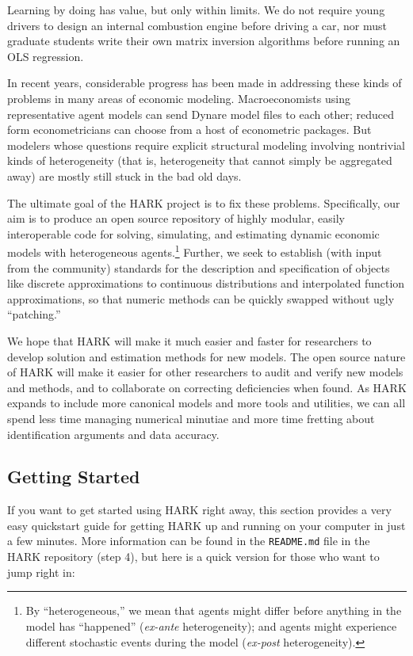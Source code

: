 \documentclass[12pt,titlepage,letterpaper]{econtex}
\begin{document}
{Learning by doing has value, but only within limits.  We do not require young drivers to design an internal combustion engine before driving a car, nor must graduate students write their own matrix inversion algorithms before running an OLS regression.  

In recent years, considerable progress has been made in addressing these kinds of problems in many areas of economic modeling.  Macroeconomists using representative agent models can send Dynare model files to each other; reduced form econometricians can choose from a host of econometric packages.  But modelers whose questions require explicit structural modeling involving nontrivial kinds of heterogeneity (that is, heterogeneity that cannot simply be aggregated away) are mostly still stuck in the bad old days.

The ultimate goal of the HARK project is to fix these problems.  Specifically, our aim is to produce an open source repository of highly modular, easily interoperable code for solving, simulating, and estimating dynamic economic models with heterogeneous agents.\footnote{By ``heterogeneous,'' we mean that agents might differ before anything in the model has ``happened'' (\textit{ex-ante} heterogeneity); and agents might experience different stochastic events during the model (\textit{ex-post} heterogeneity).}  Further, we seek to establish (with input from the community) standards for the description and specification of objects like discrete approximations to continuous distributions and interpolated function approximations, so that numeric methods can be quickly swapped without ugly ``patching.''

We hope that HARK will make it much easier and faster for researchers to develop solution and estimation methods for new models.  The open source nature of HARK will make it easier for other researchers to audit and verify new models and methods, and to collaborate on correcting deficiencies when found.  As HARK expands to include more canonical models and more tools and utilities, we can all spend less time managing numerical minutiae and more time fretting about identification arguments and data accuracy.

\subsection{Getting Started}\label{sec:GettingStarted}

If you want to get started using HARK right away, this section provides a very easy quickstart guide for getting HARK up and running on your computer in just a few minutes.  More information can be found in the \texttt{README.md} file in the HARK repository (step 4), but here is a quick version for those who want to jump right in:

}
\end{document}
